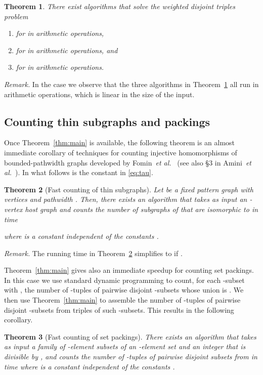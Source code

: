 \documentclass{amsart}
\newtheorem{Thm}{Theorem}
\begin{document}
\begin{Thm}
\label{thm:q234}
There exist algorithms that solve the weighted disjoint triples 
problem 
\begin{enumerate}
\item
for  in  arithmetic operations,
\item
for  in  arithmetic operations, and
\item
for  in  arithmetic operations.
\end{enumerate}
\end{Thm}

{\em Remark.} In the case  we observe that the three
algorithms in Theorem~\ref{thm:q234} all run in  
arithmetic operations, which is linear in the size of the input.

\subsection{Counting thin subgraphs and packings}

Once Theorem~\ref{thm:main} is available, the following theorem is an 
almost immediate corollary of techniques for counting injective 
homomorphisms of bounded-pathwidth graphs developed by 
Fomin~{\em et al.}~\cite{FLRRS12} 
(see also \S3 in Amini~{\em et al.}~\cite{AFS12}).
In what follows  is the constant in \eqref{eq:tau}. 

\begin{Thm}[Fast counting of thin subgraphs]
\label{thm:subgraph}
Let  be a fixed pattern graph with  vertices and pathwidth . 
Then, there exists an algorithm that takes as input an -vertex
host graph  and counts the number of subgraphs of  that are 
isomorphic to  in time 

where  is a constant independent of the constants .
\end{Thm}

\noindent
{\em Remark.} The running time in Theorem~\ref{thm:subgraph} 
simplifies to  if .

\medskip
Theorem~\ref{thm:main} gives also an immediate speedup for counting set 
packings. In this case we use standard dynamic programming to count, 
for each -subset  with , the number of -tuples of 
pairwise disjoint -subsets whose union is . 
We then use Theorem~\ref{thm:main} to 
assemble the number of -tuples of pairwise disjoint -subsets
from triples of such -subsets. This results in the following corollary.

\begin{Thm}[Fast counting of set packings]
\label{thm:packings}
There exists an algorithm that takes as input 
a family  of -element subsets of an -element 
set and an integer  that is divisible by , 
and counts the number of -tuples of pairwise disjoint subsets
from  in time 
where  is a constant independent of the constants .
\end{Thm}
\end{document}

